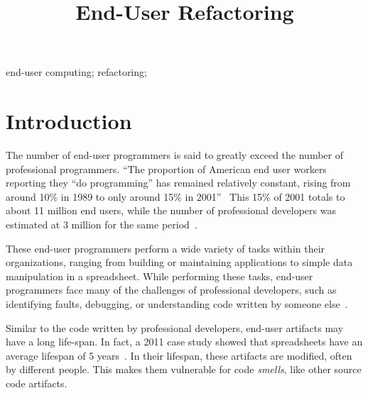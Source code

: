 \documentclass[10pt,conference,compsocconf]{IEEEtran}
\begin{document}
%
\title{End-User Refactoring}

\author{


\and
{}
}

\maketitle

\begin{abstract}
\end{abstract}


\begin{IEEEkeywords}
end-user computing; refactoring; 
\end{IEEEkeywords}

\section{Introduction}
The number of end-user programmers is said to greatly exceed the number of professional programmers. ``The proportion of American end user workers reporting they ``do programming'' has remained relatively constant, rising from around 10\% in 1989 to only around 15\% in 2001''~\cite{Scaf2005} This 15\% of 2001 totals to about 11 million end users, while the number of professional developers was estimated at 3 million for the same period~\cite{Scaf2005}.

These end-user programmers perform a wide variety of tasks within their organizations, ranging from building or maintaining applications to simple data manipulation in a spreadsheet. While performing these tasks, end-user programmers face many of the challenges of professional developers, such as identifying faults, debugging, or understanding code written by someone else~\cite{Ko2011}.

Similar to the code written by professional developers, end-user artifacts may have a long life-span. In fact, a 2011 case study showed that spreadsheets have an average lifespan of 5 years~\cite{Hermans2011}. In their lifespan, these artifacts are modified, often by different people. This makes them vulnerable for code \emph{smells}, like other source code artifacts. 
\end{document}
